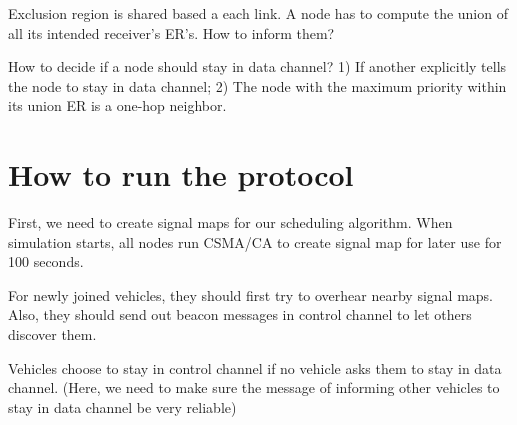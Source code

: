 \documentclass[10pt]{article}
\begin{document}
Exclusion region is shared based a each link. A node has to compute the union of all its intended receiver's ER's. How to inform them?

How to decide if a node should stay in data channel? 1) If another explicitly tells the node to stay in data channel; 2) The node with the maximum priority within its union ER is a one-hop neighbor.


\section{How to run the protocol}
First, we need to create signal maps for our scheduling algorithm. When simulation starts, all nodes run CSMA/CA to create signal map for later use for 100 seconds.

For newly joined vehicles, they should first try to overhear nearby signal maps. Also, they should send out beacon messages in control channel to let others discover them.

Vehicles choose to stay in control channel if no vehicle asks them to stay in data channel. (Here, we need to make sure the message of informing other vehicles to stay in data channel be very reliable) 
\end{document}
